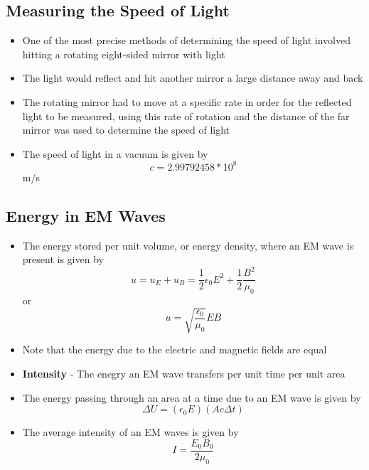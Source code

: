 \subsection{Measuring the Speed of Light}
\begin{itemize}
    \item One of the most precise methods of determining the speed of light involved hitting a rotating eight-sided mirror with light
    \item The light would reflect and hit another mirror a large distance away and back
    \item The rotating mirror had to move at a specific rate in order for the reflected light to be measured, using this rate of rotation and the distance of the far mirror was used to determine the speed of light
    \item The speed of light in a vacuum  is given by \[c=2.99792458*10^8\]m/s
\end{itemize}

\subsection{Energy in EM Waves}
\begin{itemize}
    \item The energy stored per unit volume, or energy density, where an EM wave is present is given by \[u=u_E+u_B=\frac{1}{2}\epsilon_0E^2+\frac{1}{2}\frac{B^2}{\mu_0}\] or \[u=\sqrt{\frac{\epsilon_0}{\mu_0}}EB\]
    \item Note that the energy due to the electric and magnetic fields are equal
    \item \textbf{Intensity} - The enegry an EM wave transfers per unit time per unit area
    \item The energy passing through an area at a time due to an EM wave is given by \[\Delta U=(\epsilon_0E)(Ac\Delta t)\]
    \item The average intensity of an EM waves is given by \[I=\frac{E_0B_0}{2\mu_0}\]
\end{itemize}

